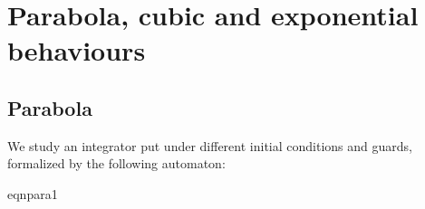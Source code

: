 \documentclass[a4paper,11pt]{article}
\begin{document}
\section{Parabola, cubic and exponential behaviours}
\label{sec:parabola}

\subsection{Parabola}

We study an integrator put under different initial conditions and
guards, formalized by the following automaton:
\begin{center}
\begin{gif}[][130][130]{eqnpara1}\boldmath
  \vspace*{10ex}


\end{gif}
\end{center}
\end{document}
